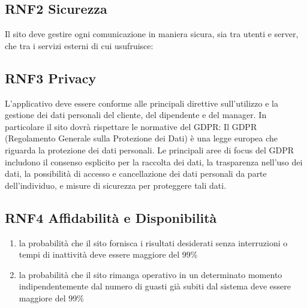 \documentclass{report}
\begin{document}
\subsection*{RNF2 Sicurezza}
Il sito deve gestire ogni comunicazione in maniera sicura, sia tra utenti e server, che tra i servizi esterni di cui usufruisce:


\subsection*{RNF3 Privacy}

L’applicativo deve essere conforme alle principali direttive sull’utilizzo e la gestione dei dati personali del cliente, del dipendente e del manager. In particolare il sito dovrà rispettare le normative del GDPR:
\newline Il GDPR (Regolamento Generale sulla Protezione dei Dati) è una legge europea che riguarda la protezione dei dati personali.
Le principali aree di focus del GDPR includono il consenso esplicito per la raccolta dei dati, la trasparenza nell'uso dei dati, la possibilità di accesso e cancellazione dei dati personali da parte dell'individuo, e misure di sicurezza per proteggere tali dati. 


\subsection*{RNF4 Affidabilità e Disponibilità}
\begin{enumerate}
	\item la probabilità che il sito fornisca i risultati desiderati senza interruzioni o tempi di inattività deve essere maggiore del 99\%
	\item la probabilità che il sito rimanga operativo in un determinato momento indipendentemente dal numero di guasti già subiti dal sistema deve essere maggiore del 99\%
	 
\end{enumerate}
\end{document}
